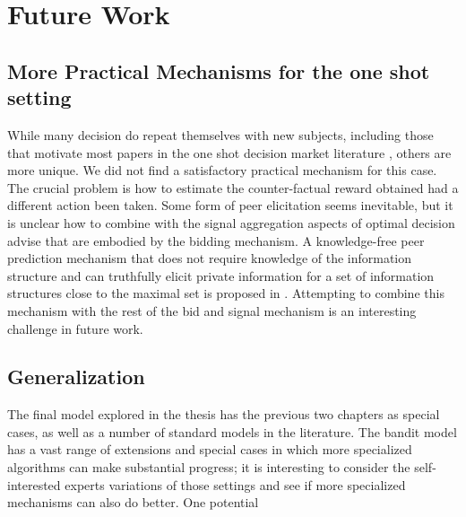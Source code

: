 
\section{Future Work} \label{sec:future}
\subsection{More Practical Mechanisms for the one shot setting}

While many decision do repeat themselves with new subjects, including those that motivate most papers in the one shot decision market literature , others are more unique. 
We did not find a satisfactory practical mechanism for this case.
The crucial problem is how to estimate the counter-factual reward obtained had a different action been taken.
Some form of peer elicitation seems inevitable, but it is unclear how to combine with the signal aggregation aspects of optimal decision advise that are embodied by the bidding mechanism. 
A knowledge-free peer prediction mechanism that does not require knowledge of the information structure and
can truthfully elicit private information for a set of information structures close to the maximal set is proposed in \cite{zhang2014elicitability}. 
Attempting to combine this mechanism with the rest of the bid and signal mechanism is an interesting challenge in future work. 



\subsection{Generalization}

The final model explored in the thesis has the previous two chapters as special cases, as well as a number of standard models in the literature.
The bandit model has a vast range of extensions and special cases in which more specialized algorithms can make substantial progress; it is interesting to consider the self-interested experts variations of those settings and see if more specialized mechanisms can also do better.
One potential 


